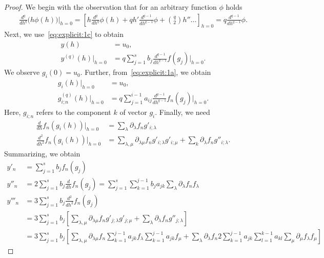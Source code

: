 

\begin{proof}
  We begin with the observation that for an arbitrary function $\phi$ holds
  \begin{gather*}
     \frac{d^{q}}{d h^{q}}\bigl(h\phi(h)\bigr)\bigg|_{h=0}
     = \left[ h \frac{d^{q}}{d h^{q}} \phi(h) + q h'
       \frac{d^{q-1}}{d h^{q-1}} \phi + \binom{q}{2}
       h''\dots\right]_{h=0}
     = q \frac{d^{q-1}}{d h^{q-1}} \phi.
  \end{gather*}
  Next, we use~\eqref{eq:explicit:1c} to obtain
  \begin{align*}
    y(h) &= u_0, \\
    y^{(q)}(h)\big|_{h=0} &= q \sum_{j=1}^s b_j \frac{d^{q-1}}{d h^{q-1}} f(g_j)\bigg|_{h=0}.
  \end{align*}
  We observe $g_i(0) = u_0$. Further, from~\eqref{eq:explicit:1a}, we
  obtain
  \begin{align*}
    g_i(h)\big|_{h=0} &= u_0, \\
    g_{i;n}^{(q)}(h)\big|_{h=0} &= q \sum_{j=1}^{i-1} a_{ij}
                                  \frac{d^{q-1}}{d h^{q-1}} f_n(g_{j})\bigg|_{h=0}.
  \end{align*}
  Here, $g_{i;n}$ refers to the component $k$ of vector
  $g_i$. Finally, we need
  \begin{align*}
    \frac{d}{d h} f_n(g_i(h))\big|_{h=0}
    & = \sum_{\lambda} \partial_{\lambda} f_n g'_{i;\lambda}\\
    \frac{d^2}{d h^2} f_n(g_i(h))\big|_{h=0}
    & = \sum_{\lambda,\mu} \partial_{\lambda\mu} f_n g'_{i;\lambda} g'_{i;\mu}
      + \sum_k \partial_{\lambda} f_n g''_{i;\lambda}.
  \end{align*}
  Summarizing, we obtain
  \begin{align*}
    y'_n &= \sum_{j=1}^s b_j f_n(g_j)
    \\
    y''_n &= 2 \sum_{j=1}^s b_j\frac{d}{d h} f_n(g_j)
    = \sum_{j=1}^s \sum_{k=1}^{j-1} b_j a_{j k}
            \sum_{\lambda} \partial_{\lambda} f_n f_\lambda
    \\
    y'''_n &= 3 \sum_{j=1}^s b_j\frac{d^2}{d h^2} f_n(g_j)
    \\&= 3 \sum_{j=1}^s b_j \left[
      \sum_{\lambda,\mu} \partial_{\lambda\mu} f_n g'_{j;\lambda} g'_{j;\mu}
      + \sum_\lambda \partial_{\lambda} f_n g''_{j;\lambda}\right]
    \\&= 3 \sum_{j=1}^s b_j \left[
        \sum_{\lambda,\mu} \partial_{\lambda\mu} f_n \sum_{k=1}^{j-1} a_{j k}
        f_\lambda \sum_{k=1}^{j-1} a_{j k}
        f_\mu + \sum_{\lambda} \partial_{\lambda} f_n 2 \sum_{k=1}^{j-1}
        a_{j k} \sum_{l=1}^{k-1} a_{kl} \sum_\mu \partial_\mu f_\lambda f_\mu
        \right]
  \end{align*}
\end{proof}

